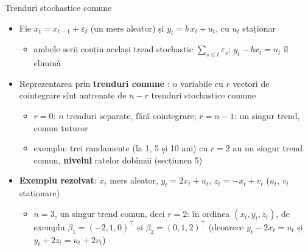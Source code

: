 \begin{frame}{Trenduri stochastice comune}
\itemsize{\small}
\begin{itemize}
    \item Fie $x_t = x_{t-1} + \varepsilon_t$ (un mers aleator) și $y_t = b\,x_t + u_t$, cu $u_t$ staționar
    \begin{itemize}
        \item ambele serii conțin același trend stochastic $\sum_{s \le t} \varepsilon_s$; $y_t - b x_t = u_t$ îl elimină
    \end{itemize}
    \item Reprezentarea prin \textbf{trenduri comune} : $n$ variabile cu $r$ vectori de cointegrare sînt antrenate de $n - r$ trenduri stochastice comune
    \begin{itemize}
        \item $r = 0$: $n$ trenduri separate, fără cointegrare; $r = n - 1$: un singur trend, comun tuturor
        \item exemplu: trei randamente (la 1, 5 și 10 ani) cu $r = 2$ au un singur trend comun, \textbf{nivelul} ratelor dobînzii (secțiunea 5)
    \end{itemize}
    \item \textbf{Exemplu rezolvat}: $x_t$ mers aleator, $y_t = 2x_t + u_t$, $z_t = -x_t + v_t$ ($u_t$, $v_t$ staționare)
    \begin{itemize}
        \item $n = 3$, un singur trend comun, deci $r = 2$: în ordinea $(x_t, y_t, z_t)$, de exemplu $\beta_1 = (-2, 1, 0)^\top$ și $\beta_2 = (0, 1, 2)^\top$ (deoarece $y_t - 2x_t = u_t$ și $y_t + 2z_t = u_t + 2v_t$)
    \end{itemize}
\end{itemize}
\end{frame}

